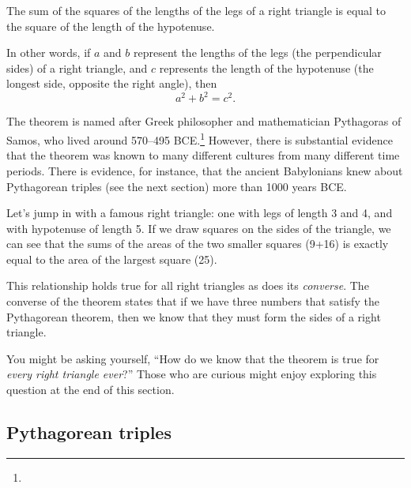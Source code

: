 \begin{boxeddef}
The sum of the squares of the lengths of the \glspl{leg} of a right triangle is equal to the square of the length of the \gls{hypotenuse}.

In other words, if $a$ and $b$ represent the lengths of the legs (the perpendicular sides) of a right triangle, and $c$ represents the length of the hypotenuse (the longest side, opposite the right angle), then \[a^2 + b^2 = c^2.\]
\end{boxeddef}

The theorem is named after Greek philosopher and mathematician Pythagoras of Samos, who lived around 570--495 BCE.\footnote{} However, there is substantial evidence that the theorem was known to many different cultures from many different time periods. There is evidence, for instance, that the ancient Babylonians knew about Pythagorean triples (see the next section) more than 1000 years BCE.

Let's jump in with a famous right triangle: one with legs of length 3 and 4, and with hypotenuse of length 5. If we draw squares on the sides of the triangle, we can see that the sums of the areas of the two smaller squares (9+16) is exactly equal to the area of the largest square (25).
\begin{center}
\end{center}

This relationship holds true for all right triangles as does its \textit{converse}. The converse of the theorem states that if we have three numbers that satisfy the Pythagorean theorem, then we know that they must form the sides of a right triangle.

You might be asking yourself, ``How do we know that the theorem is true for \textit{every right triangle ever}?'' Those who are curious might enjoy exploring this question at the end of this section.

\subsection{{P}ythagorean triples}

